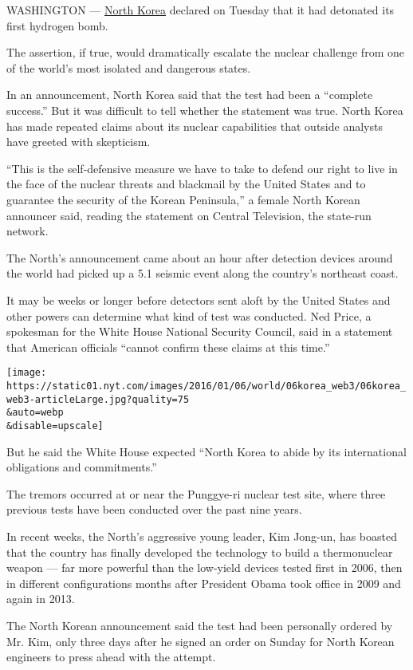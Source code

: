 WASHINGTON ---
\href{http://www.nytimes.com/2016/01/07/world/asia/north-korea-hydrogen-bomb-claim-reactions.html}{North
Korea} declared on Tuesday that it had detonated its first hydrogen
bomb.

The assertion, if true, would dramatically escalate the nuclear
challenge from one of the world's most isolated and dangerous states.

In an announcement, North Korea said that the test had been a ``complete
success.'' But it was difficult to tell whether the statement was true.
North Korea has made repeated claims about its nuclear capabilities that
outside analysts have greeted with skepticism.

``This is the self-defensive measure we have to take to defend our right
to live in the face of the nuclear threats and blackmail by the United
States and to guarantee the security of the Korean Peninsula,'' a female
North Korean announcer said, reading the statement on Central
Television, the state-run network.

The North's announcement came about an hour after detection devices
around the world had picked up a 5.1 seismic event along the country's
northeast coast.

It may be weeks or longer before detectors sent aloft by the United
States and other powers can determine what kind of test was conducted.
Ned Price, a spokesman for the White House National Security Council,
said in a statement that American officials ``cannot confirm these
claims at this time.''

\texttt{[image: https://static01.nyt.com/images/2016/01/06/world/06korea\_web3/06korea\_web3-articleLarge.jpg?quality=75\\\&auto=webp\\\&disable=upscale]}

But he said the White House expected ``North Korea to abide by its
international obligations and commitments.''

The tremors occurred at or near the Punggye-ri nuclear test site, where
three previous tests have been conducted over the past nine years.

In recent weeks, the North's aggressive young leader, Kim Jong-un, has
boasted that the country has finally developed the technology to build a
thermonuclear weapon --- far more powerful than the low-yield devices
tested first in 2006, then in different configurations months after
President Obama took office in 2009 and again in 2013.

The North Korean announcement said the test had been personally ordered
by Mr. Kim, only three days after he signed an order on Sunday for North
Korean engineers to press ahead with the attempt.

